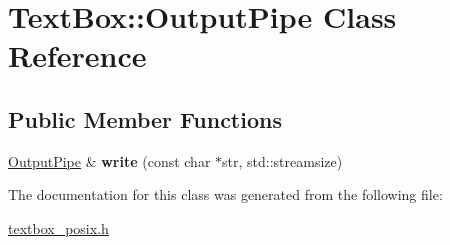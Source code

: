 \hypertarget{a00040}{}\section{Text\+Box\+:\+:Output\+Pipe Class Reference}
\label{a00040}
\subsection*{Public Member Functions}
\begin{DoxyCompactItemize}
\item 
\mbox{\label{a00040_a45dbdf8eafaa645b77dc9bbad21a8ad3}} 
\hyperlink{a00040}{Output\+Pipe} \& {\bfseries write} (const char $\ast$str, std\+::streamsize)
\end{DoxyCompactItemize}


The documentation for this class was generated from the following file\+:\begin{DoxyCompactItemize}
\item 
\hyperlink{a00008}{textbox\+\_\+posix.\+h}\end{DoxyCompactItemize}
